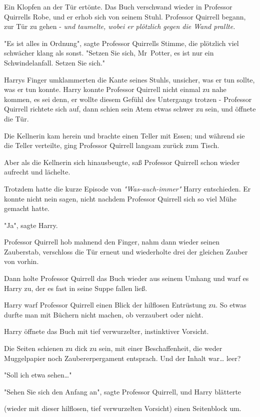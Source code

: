 {Ein Klopfen an der Tür ertönte. Das Buch verschwand wieder in Professor Quirrells Robe, und er erhob sich von seinem Stuhl. Professor Quirrell begann, zur Tür zu gehen - \emph{und taumelte, wobei er plötzlich gegen die Wand prallte.}

"Es ist alles in Ordnung", sagte Professor Quirrells Stimme, die plötzlich viel schwächer klang als sonst. "Setzen Sie sich, Mr~Potter, es ist nur ein Schwindelanfall. Setzen Sie sich."

Harrys Finger umklammerten die Kante seines Stuhls, unsicher, was er tun sollte, was er tun konnte. Harry konnte Professor Quirrell nicht einmal zu nahe kommen, es sei denn, er wollte diesem Gefühl des Untergangs trotzen - Professor Quirrell richtete sich auf, dann schien sein Atem etwas schwer zu sein, und öffnete die Tür.

Die Kellnerin kam herein und brachte einen Teller mit Essen; und während sie die Teller verteilte, ging Professor Quirrell langsam zurück zum Tisch.

Aber als die Kellnerin sich hinausbeugte, saß Professor Quirrell schon wieder aufrecht und lächelte.

Trotzdem hatte die kurze Episode von \emph{"Was-auch-immer"} Harry entschieden. Er konnte nicht nein sagen, nicht nachdem Professor Quirrell sich so viel Mühe gemacht hatte.

"Ja", sagte Harry.

Professor Quirrell hob mahnend den Finger, nahm dann wieder seinen Zauberstab, verschloss die Tür erneut und wiederholte drei der gleichen Zauber von vorhin.

Dann holte Professor Quirrell das Buch wieder aus seinem Umhang und warf es Harry zu, der es fast in seine Suppe fallen ließ.

Harry warf Professor Quirrell einen Blick der hilflosen Entrüstung zu. So etwas durfte man mit Büchern nicht machen, ob verzaubert oder nicht.

Harry öffnete das Buch mit tief verwurzelter, instinktiver Vorsicht.

Die Seiten schienen zu dick zu sein, mit einer Beschaffenheit, die weder Muggelpapier noch Zaubererpergament entsprach. Und der Inhalt war… leer?

"Soll ich etwa sehen…"

"Sehen Sie sich den Anfang an", sagte Professor Quirrell, und Harry blätterte

(wieder mit dieser hilflosen, tief verwurzelten Vorsicht) einen Seitenblock um.

}
